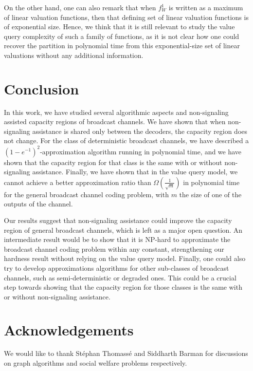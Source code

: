 On the other hand, one can also remark that when $f_W^1$ is written as a maximum of linear valuation functions, then that defining set of linear valuation functions is of exponential size. Hence, we think that it is still relevant to study the value query complexity of such a family of functions, as it is not clear how one could recover the partition in polynomial time from this exponential-size set of linear valuations without any additional information.

\section{Conclusion}
In this work, we have studied several algorithmic aspects and non-signaling assisted capacity regions of broadcast channels. We have shown that when non-signaling assistance is shared only between the decoders, the capacity region does not change. For the class of deterministic broadcast channels, we have described a $(1-e^{-1})^2$-approximation algorithm running in polynomial time, and we have shown that the capacity region for that class is the same with or without non-signaling assistance. Finally, we have shown that in the value query model, we cannot achieve a better approximation ratio than $\Omega\left(\frac{1}{\sqrt{m}}\right)$ in polynomial time for the general broadcast channel coding problem, with $m$ the size of one of the outputs of the channel.

Our results suggest that non-signaling assistance could improve the capacity region of general broadcast channels, which is left as a major open question. An intermediate result would be to show that it is \textrm{NP}-hard to approximate the broadcast channel coding problem within any constant, strengthening our hardness result without relying on the value query model. Finally, one could also try to develop approximations algorithms for other sub-classes of broadcast channels, such as semi-deterministic or degraded ones. This could be a crucial step towards showing that the capacity region for those classes is the same with or without non-signaling assistance.

\section*{Acknowledgements}
We would like to thank Stéphan Thomassé and Siddharth Barman for discussions on graph algorithms and social welfare problems respectively.
